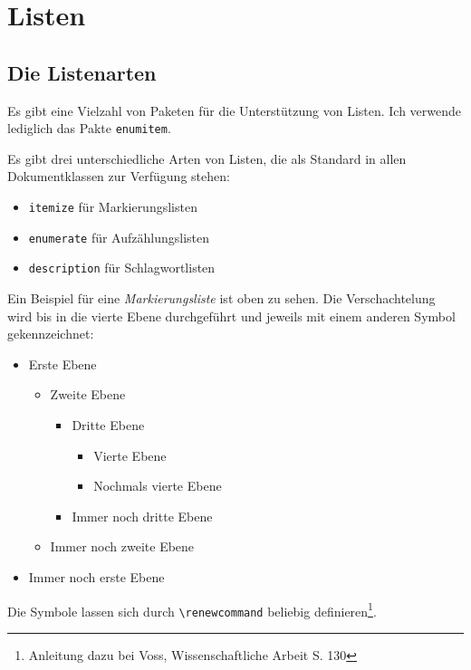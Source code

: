 \chapter{Listen}
\label{cha:listen}
\section{Die Listenarten}
Es gibt eine Vielzahl von Paketen für die Unterstützung von Listen. Ich verwende lediglich das Pakte \verb*+enumitem+.

Es gibt drei unterschiedliche Arten von Listen, die als Standard in allen Dokumentklassen zur Verfügung stehen:
\begin{itemize}
	\item \verb*+itemize+ für Markierungslisten
	\item \verb*+enumerate+ für Aufzählungslisten
	\item \verb*+description+ für Schlagwortlisten	
\end{itemize}

Ein Beispiel für eine \emph{Markierungsliste} ist oben zu sehen. Die Verschachtelung wird bis in die vierte Ebene durchgeführt und jeweils mit einem anderen Symbol gekennzeichnet:
\begin{itemize}
	\item Erste Ebene
	\begin{itemize}
		\item Zweite Ebene
		\begin{itemize}
			\item Dritte Ebene
			\begin{itemize}
				\item Vierte Ebene
				\item Nochmals vierte Ebene
			\end{itemize}
			\item Immer noch dritte Ebene
		\end{itemize}
		\item Immer noch zweite Ebene
	\end{itemize}
	\item Immer noch erste Ebene
\end{itemize}

Die Symbole lassen sich durch \verb*+\renewcommand+ beliebig definieren\footnote{Anleitung dazu bei Voss, Wissenschaftliche Arbeit S. 130}.

